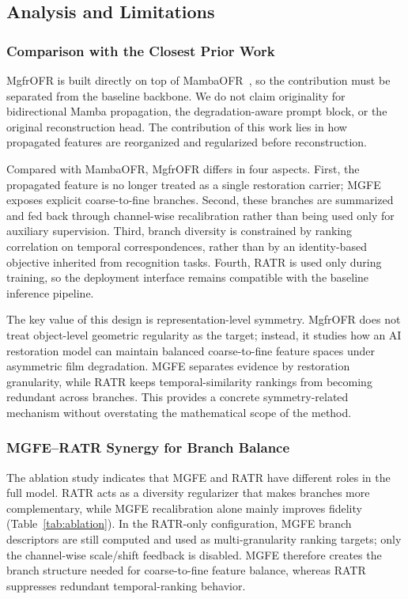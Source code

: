 \documentclass[symmetry,article,submit,pdftex,moreauthors]{Definitions/mdpi}
\begin{document}
\FloatBarrier
\subsection{Analysis and Limitations}
\label{subsec:analysis_limitations}

\subsubsection{Comparison with the Closest Prior Work}
\label{subsec:vs_mambaofr}

MgfrOFR is built directly on top of MambaOFR~\cite{mao2025mambaofr}, so the contribution must be separated from the baseline backbone. We do not claim originality for bidirectional Mamba propagation, the degradation-aware prompt block, or the original reconstruction head. The contribution of this work lies in how propagated features are reorganized and regularized before reconstruction.

Compared with MambaOFR, MgfrOFR differs in four aspects. First, the propagated feature is no longer treated as a single restoration carrier; MGFE exposes explicit coarse-to-fine branches. Second, these branches are summarized and fed back through channel-wise recalibration rather than being used only for auxiliary supervision. Third, branch diversity is constrained by ranking correlation on temporal correspondences, rather than by an identity-based objective inherited from recognition tasks. Fourth, RATR is used only during training, so the deployment interface remains compatible with the baseline inference pipeline.

The key value of this design is representation-level symmetry. MgfrOFR does not treat object-level geometric regularity as the target; instead, it studies how an AI restoration model can maintain balanced coarse-to-fine feature spaces under asymmetric film degradation. MGFE separates evidence by restoration granularity, while RATR keeps temporal-similarity rankings from becoming redundant across branches. This provides a concrete symmetry-related mechanism without overstating the mathematical scope of the method.

\subsubsection{MGFE--RATR Synergy for Branch Balance}
\label{subsec:synergy}

The ablation study indicates that MGFE and RATR have different roles in the full model. RATR acts as a diversity regularizer that makes branches more complementary, while MGFE recalibration alone mainly improves fidelity (Table~\ref{tab:ablation}). In the RATR-only configuration, MGFE branch descriptors are still computed and used as multi-granularity ranking targets; only the channel-wise scale/shift feedback is disabled. MGFE therefore creates the branch structure needed for coarse-to-fine feature balance, whereas RATR suppresses redundant temporal-ranking behavior.
\end{document}
